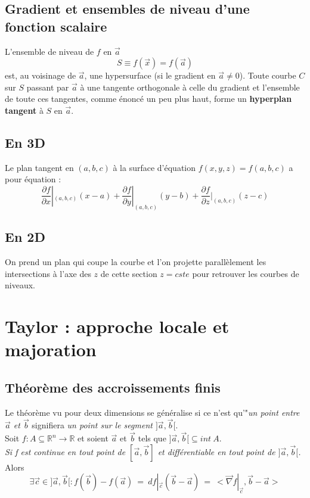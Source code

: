 \documentclass[11pt, a4paper, openany]{book}
\begin{document}
\subsection{Gradient et ensembles de niveau d'une fonction scalaire}
L'ensemble de niveau de $f$ en $\vec{a}$
$$S \equiv f(\vec{x}) = f(\vec{a})$$
est, au voisinage de $\vec{a}$, une hypersurface (si le gradient en $\vec{a} \neq 0$). Toute courbe $C$ sur $S$ passant par $\vec{a}$ à une tangente orthogonale à celle du gradient et l'ensemble de toute ces tangentes, comme énoncé un peu plus haut, forme un \textbf{hyperplan tangent} à $S$ en $\vec{a}$.

\subsection*{En 3D}
Le plan tangent en $(a, b, c)$ à la surface d'équation $f(x,y,z) = f(a, b, c)$ a pour équation :
$$\frac{\partial f}{\partial x}|_{(a, b, c)} (x-a) + \frac{\partial f}{\partial y}|_{(a, b, c)} (y-b) + \frac{\partial f}{\partial z}|_{(a, b, c)} (z-c)$$

\subsection*{En 2D}
On prend un plan qui coupe la courbe et l'on projette parallèlement les intersections à l'axe des $z$ de cette section $z = cste$ pour retrouver les courbes de niveaux.

\section{Taylor : approche locale et majoration}
\subsection{Théorème des accroissements finis}
Le théorème vu pour deux dimensions se généralise si ce n'est qu'"\textit{un point entre $\vec{a}$ et $\vec{b}$} signifiera \textit{un point sur le segment $]\vec{a}, \vec{b}[$}.
\\

Soit $f : A \subseteq \mathbb{R}^n \rightarrow \mathbb{R}$ et soient $\vec{a}$ et $\vec{b}$ tels que $]\vec{a}, \vec{b}[ \subseteq int\ A$.\\
\textit{Si f est continue en tout point de $[\vec{a}, \vec{b}]$ et différentiable en tout point de $]\vec{a}, \vec{b}[$.}\\
Alors
$$\exists \vec{c} \in ]\vec{a}, \vec{b}[ : f(\vec{b}) - f(\vec{a})\ =\ df|_{\vec{c}} (\vec{b} - \vec{a})\ =\ < \vec{\nabla}f|_{\vec{c}}, \vec{b} - \vec{a} >$$
\end{document}
